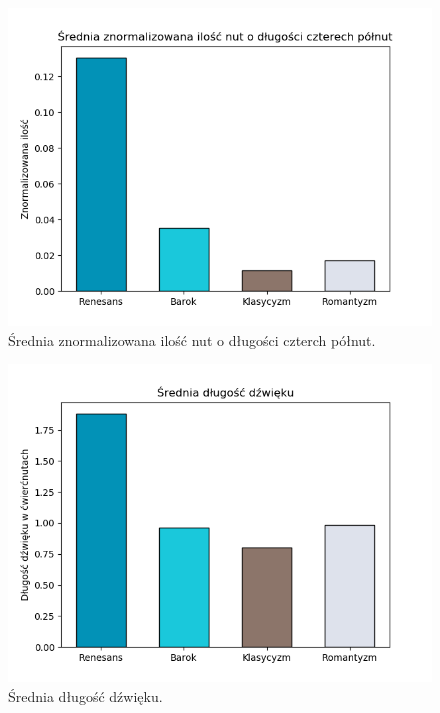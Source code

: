 \documentclass[printmode, eng]{mgr}
\begin{document}
\begin{figure}[H]
\centering
\includegraphics[scale=0.75]{plots/4fullnotes.png}
\caption{Średnia znormalizowana ilość nut o długości czterch półnut.}
\end{figure}
\begin{figure}[H]
\centering
\includegraphics[scale=0.75]{plots/avg_note_dur.png}
\caption{Średnia długość dźwięku.}
\end{figure}
\end{document}
